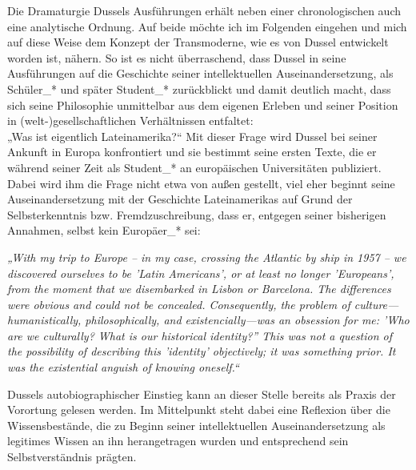 \noindent Die Dramaturgie Dussels Ausführungen erhält neben einer chronologischen auch
eine analytische Ordnung. Auf beide möchte ich im Folgenden eingehen und mich
auf diese Weise dem Konzept der Transmoderne, wie es von Dussel entwickelt
worden ist, nähern. So ist es nicht überraschend, dass Dussel in seine
Ausführungen auf die Geschichte seiner intellektuellen Auseinandersetzung, als
Schüler\_* und später Student\_* zurückblickt und damit deutlich macht, dass sich
seine Philosophie unmittelbar aus dem eigenen Erleben und seiner Position in
(welt-)gesellschaftlichen Verhältnissen entfaltet:\footnotemark {}\\
„Was ist eigentlich Lateinamerika?“ Mit dieser Frage wird Dussel bei seiner
Ankunft in Europa konfrontiert und sie bestimmt seine ersten Texte, die er
während seiner Zeit als Student\_* an europäischen Universitäten publiziert.
Dabei wird ihm die Frage nicht etwa von außen gestellt, viel eher beginnt seine
Auseinandersetzung mit der Geschichte Lateinamerikas auf Grund der
Selbsterkenntnis bzw. Fremdzuschreibung, dass er, entgegen seiner bisherigen
Annahmen, selbst kein Europäer\_* sei:
\begin{myenv}
    \textit{ „With my trip to Europe – in my case, crossing the Atlantic by ship
    in 1957 – we discovered ourselves to be 'Latin Americans', or at least no
    longer 'Europeans', from the moment that we disembarked in Lisbon or
    Barcelona. The differences were obvious and could not be concealed.
    Consequently, the problem of culture—humanistically, philosophically, and
    existencially—was an obsession for me: 'Who are we culturally? What is our
    historical identity?'' This was not a question of the possibility of
    describing this 'identity' objectively; it was something prior. It was the
    existential anguish of knowing oneself.“\footnotemark {}}
\end{myenv}
Dussels autobiographischer Einstieg kann an dieser Stelle bereits als Praxis der
Vorortung gelesen werden. Im Mittelpunkt steht dabei eine Reflexion über die
Wissensbestände, die zu Beginn seiner intellektuellen Auseinandersetzung als
legitimes Wissen an ihn herangetragen wurden und entsprechend sein
Selbstverständnis prägten. \\

